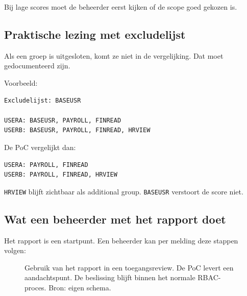 Bij lage scores moet de beheerder eerst kijken of de scope goed gekozen is.

\subsection*{Praktische lezing met excludelijst}

Als een groep is uitgesloten, komt ze niet in de vergelijking. Dat moet gedocumenteerd zijn.

Voorbeeld:

\begin{verbatim}
Excludelijst: BASEUSR

USERA: BASEUSR, PAYROLL, FINREAD
USERB: BASEUSR, PAYROLL, FINREAD, HRVIEW
\end{verbatim}

De PoC vergelijkt dan:

\begin{verbatim}
USERA: PAYROLL, FINREAD
USERB: PAYROLL, FINREAD, HRVIEW
\end{verbatim}

\texttt{HRVIEW} blijft zichtbaar als additional group. \texttt{BASEUSR} verstoort de score niet.

\subsection*{Wat een beheerder met het rapport doet}

Het rapport is een startpunt. Een beheerder kan per melding deze stappen volgen:

\begin{figure}[htbp]
	\centering
	\caption[Gebruik van het rapport in review]{Gebruik van het rapport in een toegangsreview. De PoC levert een aandachtspunt. De beslissing blijft binnen het normale RBAC-proces. Bron: eigen schema.}
	\label{fig:rapport-reviewproces}
\end{figure}

